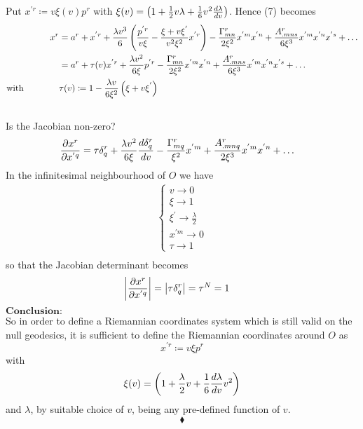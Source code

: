 Put $x^{'r} \coloneqq   v\xi(v) p^r$ with $\xi(v) = \left(1  + \frac{1}{2} v\lambda  +\frac{1}{6}v^2\dv{\lambda  }{v}\right)$. Hence (7) becomes
\begin{align}
\ x^r &= a^r + x^{'r} + \frac{\lambda v^3}{6}  \left( \frac{p^{'r}}{v\xi} - \frac{\xi + v\xi^{'}}{v^2\xi^2}x^{'r}\right)  -  \frac{\Gamma^r_{mn}}{2\xi ^2}x^{'m}x^{'n} + \frac{A^r_{.mns}}{6\xi ^3}x^{'m}x^{'n}x^{'s}+\dots\\
\ & = a^r + \tau(v) x^{'r}+ \frac{\lambda v^2 }{6\xi}p^{'r} -  \frac{\Gamma^r_{mn}}{2\xi ^2}x^{'m}x^{'n}   + \frac{A^r_{.mns}}{6\xi ^3}x^{'m}x^{'n}x^{'s}+\dots\\
\text{with}\quad\quad\quad\quad & \tau(v)  \coloneqq 1-\frac{\lambda v}{6\xi^2}\left( \xi + v\xi^{'}\right)
\end{align}\\
Is the Jacobian non-zero?
\begin{align}
\pdv{x^r}{x^{'q}}  & = \tau\delta^r_q+ \frac{\lambda  v^2}{6\xi}\dv{\delta^r_q}{v} -  \frac{\Gamma^r_{mq}}{\xi ^2}x^{'m}   + \frac{A^r_{.mnq}}{2\xi ^3}x^{'m}x^{'n}+\dots
\end{align}
In the infinitesimal neighbourhood of $O$ we have \\
\begin{align}\left \{ \begin{array}{l} 
v \rightarrow 0\\  
\xi \rightarrow 1\\
\xi^{'} \rightarrow \frac{\lambda }{2}\\ 
x^{'m} \rightarrow 0\\
\tau \rightarrow 1 
\end{array} \right.\\
\end{align}
so that the Jacobian determinant becomes
\begin{align}
\left| \pdv{x^r}{x^{'q}} \right| &= \left| \tau\delta^r_q \right| =\tau ^N = 1
\end{align}
$\textbf{Conclusion:}$\\
So in order to define a Riemannian coordinates system which is still valid on the null geodesics, it is sufficient to define the Riemannian coordinates around $O$ as $$ x^{'r} \coloneqq   v\xi p^r$$ with $$\xi(v) = \left(1  + \frac{\lambda}{2} v +\frac{1}{6}\dv{\lambda }{v} v^2\right) $$
and $\lambda $, by suitable choice of $v$, being any pre-defined function of $v$.
$$\blacklozenge$$
\newpage
